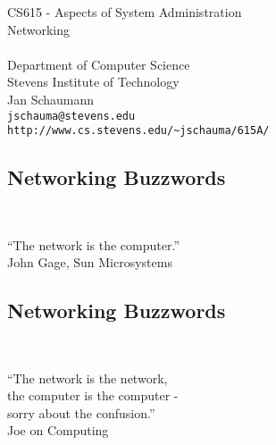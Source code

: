 \documentclass[xga]{xdvislides}
\begin{document}
\setfontphv

\lhead{\slidetitle}                               %
\cfoot{\relax}                               %
\rfoot{\Gray{\today}}

\vspace*{\fill}
\begin{center}
	\Hugesize
		CS615 - Aspects of System Administration\\ [1em]
		Networking\\ [1em]
	\hspace*{5mm}\blueline\\ [1em]
	\Normalsize
		Department of Computer Science\\
		Stevens Institute of Technology\\
		Jan Schaumann\\
		\verb+jschauma@stevens.edu+\\
		\verb+http://www.cs.stevens.edu/~jschauma/615A/+
\end{center}
\vspace*{\fill}

\subsection{Networking Buzzwords}
\\

\newcommand{\gargantuan}{\fontsize{45}{50}\selectfont}
\gargantuan
\begin{center}
``The network is the computer.'' \\
\small
\vspace*{.5in}
John Gage, Sun Microsystems
\end{center}
\Normalsize

\subsection{Networking Buzzwords}
\\

\gargantuan
\begin{center}
``The network is the network, \\
the computer is the computer - \\
sorry about the confusion.'' \\
\small
\vspace*{.5in}
Joe on Computing
\end{center}
\Normalsize
\end{document}
